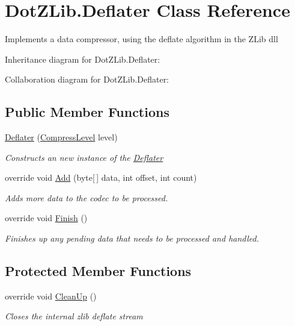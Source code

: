\hypertarget{class_dot_z_lib_1_1_deflater}{\section{Dot\+Z\+Lib.\+Deflater Class Reference}
\label{class_dot_z_lib_1_1_deflater}
}


Implements a data compressor, using the deflate algorithm in the Z\+Lib dll  




Inheritance diagram for Dot\+Z\+Lib.\+Deflater\+:


Collaboration diagram for Dot\+Z\+Lib.\+Deflater\+:
\subsection*{Public Member Functions}
\begin{DoxyCompactItemize}
\item 
\hyperlink{class_dot_z_lib_1_1_deflater_a3af92869710011e866633c2186c7cab1}{Deflater} (\hyperlink{namespace_dot_z_lib_a034f7a1ef9856d8834e6f6b1c53d8a4c}{Compress\+Level} level)
\begin{DoxyCompactList}\small\item\em Constructs an new instance of the {\ttfamily \hyperlink{class_dot_z_lib_1_1_deflater}{Deflater}} \end{DoxyCompactList}\item 
override void \hyperlink{class_dot_z_lib_1_1_deflater_a2db95e3ca07e562df0652ed1ad8d0c4d}{Add} (byte\mbox{[}$\,$\mbox{]} data, int offset, int count)
\begin{DoxyCompactList}\small\item\em Adds more data to the codec to be processed. \end{DoxyCompactList}\item 
override void \hyperlink{class_dot_z_lib_1_1_deflater_a84507769a20a13c2ff48cfcef8f5c13b}{Finish} ()
\begin{DoxyCompactList}\small\item\em Finishes up any pending data that needs to be processed and handled. \end{DoxyCompactList}\end{DoxyCompactItemize}
\subsection*{Protected Member Functions}
\begin{DoxyCompactItemize}
\item 
override void \hyperlink{class_dot_z_lib_1_1_deflater_af06ac29d92dbe5d6198b8fa906476e05}{Clean\+Up} ()
\begin{DoxyCompactList}\small\item\em Closes the internal zlib deflate stream \end{DoxyCompactList}\end{DoxyCompactItemize}
